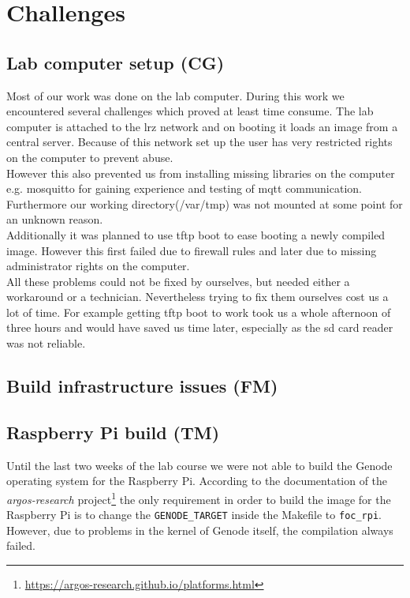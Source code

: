 \section{Challenges}
\label{sec:challenges}


\subsection{Lab computer setup (CG)}
Most of our work was done on the lab computer. During this work we encountered several challenges which proved at least time consume. The lab computer is attached to the lrz network and on booting it loads an image from a central server. Because of this network set up the user has very restricted rights on the computer to prevent abuse.\\

However this also prevented us from installing missing libraries on the computer e.g. mosquitto for gaining experience and testing of mqtt communication. Furthermore our working directory(/var/tmp) was not mounted at some point for an unknown reason.\\

Additionally it was planned to use tftp boot to ease booting a newly compiled image. However this first failed due to firewall rules and later due to missing administrator rights on the computer.\\

All these problems could not be fixed by ourselves, but needed either a workaround or a technician. Nevertheless trying to fix them ourselves cost us a lot of time. For example getting tftp boot to work took us a whole afternoon of three hours and would have saved us time later, especially as the sd card reader was not reliable.

\subsection{Build infrastructure issues (FM)}


\subsection{Raspberry Pi build (TM)}
\label{sec:pi-problems}
Until the last two weeks of the lab course we were not able to build the Genode operating system for the Raspberry Pi. According to the documentation of the \textit{argos-research} project\footnote{\url{https://argos-research.github.io/platforms.html}} the only requirement in order to build the image for the Raspberry Pi is to change the \texttt{GENODE\_TARGET} inside the Makefile to \texttt{foc\_rpi}. However, due to problems in the kernel of Genode itself, the compilation always failed. \\

